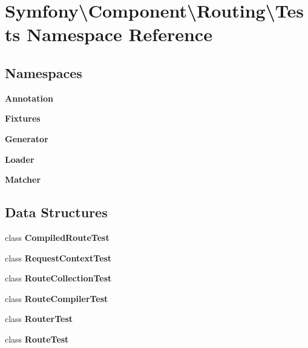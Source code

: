 \section{Symfony\textbackslash{}Component\textbackslash{}Routing\textbackslash{}Tests Namespace Reference}
\label{namespace_symfony_1_1_component_1_1_routing_1_1_tests}
\subsection*{Namespaces}
\begin{DoxyCompactItemize}
\item 
 {\bf Annotation}
\item 
 {\bf Fixtures}
\item 
 {\bf Generator}
\item 
 {\bf Loader}
\item 
 {\bf Matcher}
\end{DoxyCompactItemize}
\subsection*{Data Structures}
\begin{DoxyCompactItemize}
\item 
class {\bf Compiled\+Route\+Test}
\item 
class {\bf Request\+Context\+Test}
\item 
class {\bf Route\+Collection\+Test}
\item 
class {\bf Route\+Compiler\+Test}
\item 
class {\bf Router\+Test}
\item 
class {\bf Route\+Test}
\end{DoxyCompactItemize}
